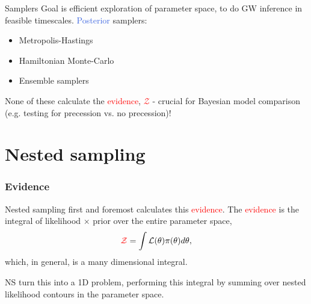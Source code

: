 \documentclass[aspectratio=169, 11pt]{beamer}
\begin{document}


\begin{frame}{Samplers}\vfill
Goal is efficient exploration of parameter space, to do GW inference in feasible timescales. 
\vfill  
    \textcolor{RoyalBlue}{Posterior} samplers:
    \begin{itemize}
        \item Metropolis-Hastings 
        \item Hamiltonian Monte-Carlo
        \item Ensemble samplers
    \end{itemize}
    \vfill
    None of these calculate the \textcolor{red}{evidence}, \textcolor{red}{$\mathcal{Z}$} - crucial for Bayesian model comparison (e.g. testing for precession vs. no precession)!

    
\end{frame}

\section{Nested sampling}

\begin{frame}
\frametitle{Evidence}
Nested sampling first and foremost calculates this \textcolor{red}{evidence}. The \textcolor{red}{evidence} is the integral of likelihood $\times$ prior over the entire parameter space,
\begin{equation}
    \textcolor{red}{\mathcal{Z}} = \int \mathcal{L(\theta)} \pi(\theta) d\theta,
\end{equation}
which, in general, is a many dimensional integral.
\vfill

NS turn this into a 1D problem, performing this integral by summing over nested likelihood contours in the parameter space.
\end{frame}
\end{document}
